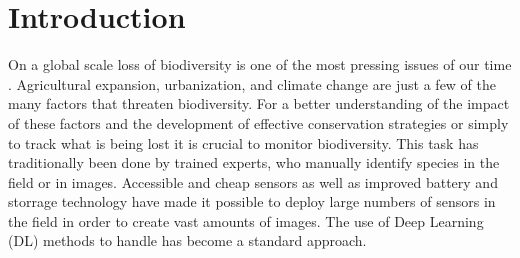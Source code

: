 

\section{Introduction}
\label{introduction}

On a global scale loss of biodiversity is one of the most pressing issues of our time \autocite{cardinaleBiodiversityLossIts2012}.
Agricultural expansion, urbanization, and climate change are just a few of the many factors that threaten biodiversity.
For a better understanding of the impact of these factors and the development of effective conservation strategies or simply to track what is being lost it is crucial to monitor biodiversity.
This task has traditionally been done by trained experts, who manually identify species in the field or in images.
Accessible and cheap sensors as well as improved battery and storrage technology have made it possible to deploy large numbers of sensors in the field in order to create vast amounts of images.
The use of Deep Learning (DL) methods to handle has become a standard approach.

